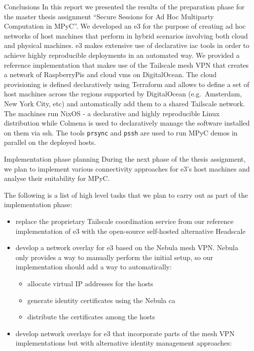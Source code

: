 \begin{frame}[fragile]{Conclusions}
\protect\hypertarget{conclusions}{}
In this report we presented the results of the preparation phase for the
master thesis assignment ``Secure Sessions for Ad Hoc Multiparty
Computation in MPyC''. We developed an \acrfull{e3} for the purpose of
creating ad hoc networks of host machines that perform 
in hybrid scenarios involving both cloud and physical machines. \gls{e3}
makes extensive use of declarative \gls{iac} tools in order to achieve
highly reproducible deployments in an automated way. We provided a
reference implementation that makes use of the Tailscale mesh VPN that
creates a network of RaspberryPis and cloud \glspl{vm} on DigitalOcean.
The cloud provisioning is defined declaratively using Terraform and
allows to define a set of host machines across the regions supported by
DigitalOcean (e.g.~Amsterdam, New York City, etc) and automatically add
them to a shared Tailscale network. The machines run NixOS - a
declarative and highly reproducible Linux distribution while Colmena is
used to declaratively manage the software installed on them via
\gls{ssh}. The tools \texttt{prsync} and \texttt{pssh} are used to run
MPyC demos in parallel on the deployed hosts.

\begin{block}{Implementation phase planning}
\protect\hypertarget{implementation-phase-planning}{}
During the next phase of the thesis assignment, we plan to implement
various connectivity approaches for \gls{e3}'s host machines and analyse
their suitability for MPyC.

The following is a list of high level tasks that we plan to carry out as
part of the implementation phase:

\begin{itemize}
\item
  replace the proprietary Tailscale coordination service from our
  reference implementation of \gls{e3} with the open-source self-hosted
  alternative Headscale\autocite{fontJuanfontHeadscale2022}
\item
  develop a network overlay for \gls{e3} based on the Nebula mesh VPN.
  Nebula only provides a way to manually perform the initial setup, so
  our implementation should add a way to automatically:

  \begin{itemize}
  \tightlist
  \item
    allocate virtual IP addresses for the hosts
  \item
    generate identity certificates using the Nebula \gls{ca}
  \item
    distribute the certificates among the hosts
  \end{itemize}
\item
  develop network overlays for \gls{e3} that incorporate parts of the
  mesh VPN implementations but with alternative identity management
  approaches:


\end{itemize}
\end{block}
\end{frame}
